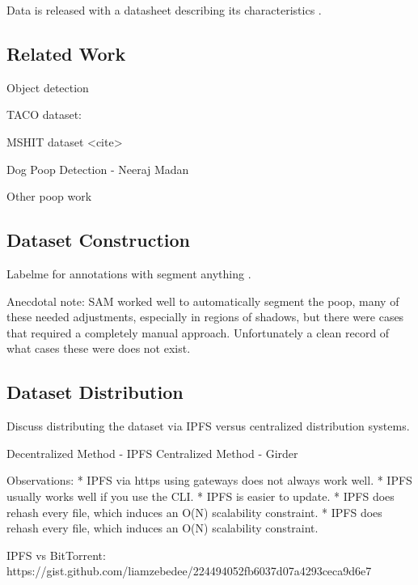 \documentclass[10pt,twocolumn,letterpaper]{article}
\begin{document}
Data is released with a datasheet describing its characteristics \cite{gebru_datasheets_2021}.



\subsection{Related Work}

Object detection

TACO dataset: \cite{proenca_taco_2020}

MSHIT dataset <cite>

Dog Poop Detection - Neeraj Madan

Other poop work

\subsection{Dataset Construction}

Labelme \cite{wada_labelmeailabelme_nodate} for annotations with segment anything \cite{kirillov_segment_2023}.

Anecdotal note: SAM worked well to automatically segment the poop, many of
these needed adjustments, especially in regions of shadows, but there were
cases that required a completely manual approach. Unfortunately a clean record
of what cases these were does not exist. 

\subsection{Dataset Distribution}

Discuss distributing the dataset via IPFS versus centralized distribution
systems.

Decentralized Method - IPFS
Centralized Method - Girder

Observations:
* IPFS via https using gateways does not always work well.
* IPFS usually works well if you use the CLI.
* IPFS is easier to update.
* IPFS does rehash every file, which induces an O(N) scalability constraint.
* IPFS does rehash every file, which induces an O(N) scalability constraint.


IPFS vs BitTorrent:
https://gist.github.com/liamzebedee/224494052fb6037d07a4293ceca9d6e7
\end{document}
